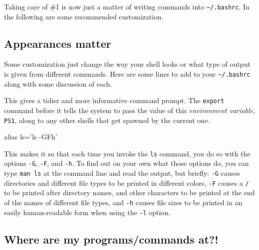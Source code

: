 \documentclass[]{krantz}
\makeatletter
\newenvironment{Shaded}{\begin{snugshade}}{\end{snugshade}}
\newcommand{\BuiltInTok}[1]{#1}
\newcommand{\NormalTok}[1]{#1}
\newcommand{\StringTok}[1]{\textcolor[rgb]{0.5,0.5,0.5}{#1}}
\newcommand{\VariableTok}[1]{\textcolor[rgb]{0,0,0}{#1}}
\newenvironment{kframe}{%
\medskip{}
\setlength{\fboxsep}{.8em}
 \def\at@end@of@kframe{}%
 \ifinner\ifhmode%
  \def\at@end@of@kframe{\end{minipage}}%
  \begin{minipage}{\columnwidth}%
 \fi\fi%
 \def\FrameCommand##1{\hskip\@totalleftmargin \hskip-\fboxsep
 \colorbox{shadecolor}{##1}\hskip-\fboxsep
     \hskip-\linewidth \hskip-\@totalleftmargin \hskip\columnwidth}%
 \MakeFramed {\advance\hsize-\width
   \@totalleftmargin\z@ \linewidth\hsize
   \@setminipage}}%
 {\par\unskip\endMakeFramed%
 \at@end@of@kframe}
\renewenvironment{Shaded}{\begin{kframe}}{\end{kframe}}
\makeatother
\begin{document}
Taking care of \#1 is now just a matter of writing commands into \texttt{\textasciitilde{}/.bashrc}. In the following
are some recommended customization.

\hypertarget{appearances-matter}{%
\subsection{Appearances matter}\label{appearances-matter}}

Some customization just change the way your shell looks or what type of output
is given from different commands. Here are some lines to add to your \texttt{\textasciitilde{}/.bashrc}
along with some discussion of each.

\begin{Shaded}
\end{Shaded}

This gives a tidier and more informative command prompt. The \texttt{export} command before
it tells the system to pass the value of this \emph{environment variable}, \texttt{PS1}, along
to any other shells that get spawned by the current one.

\begin{Shaded}
\begin{Highlighting}[]
\BuiltInTok{alias}\NormalTok{ ls=}\StringTok{'ls -GFh'}
\end{Highlighting}
\end{Shaded}

This makes it so that each time you invoke the \texttt{ls} command, you do so with the
options \texttt{-G}, \texttt{-F}, and \texttt{-h}. To find out on your own what those options do, you can
type \texttt{man\ ls} at the command line and read the output, but briefly: \texttt{-G} causes directories and
different file types to be printed in different colors, \texttt{-F} causes a \texttt{/} to be printed after
directory names, and other characters to be printed at the end of the names of different
file types, and \texttt{-h} causes file sizes to be printed in an easily human-readable form when
using the \texttt{-l} option.

\hypertarget{where-are-my-programscommands-at}{%
\subsection{Where are my programs/commands at?!}\label{where-are-my-programscommands-at}}
\end{document}
